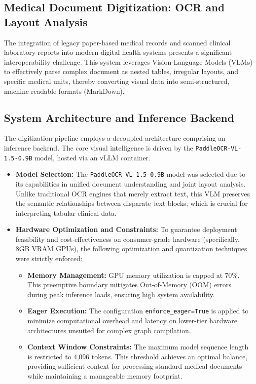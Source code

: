 \subsection{Medical Document Digitization: OCR and Layout Analysis}
\label{sec:ocr_pipeline}

The integration of legacy paper-based medical records and scanned clinical laboratory reports into modern digital health systems presents a significant interoperability challenge. This system leverages Vision-Language Models (VLMs) to effectively parse complex document as nested tables, irregular layouts, and specific medical units, thereby converting visual data into semi-structured, machine-readable formats (MarkDown).

\subsection{System Architecture and Inference Backend}
\label{subsec:ocr_backend}

The digitization pipeline employs a decoupled architecture comprising an inference backend. The core visual intelligence is driven by the \texttt{PaddleOCR-VL-1.5-0.9B} model, hosted via an vLLM container.

\begin{itemize}
    \item \textbf{Model Selection:} The \texttt{PaddleOCR-VL-1.5-0.9B} model was selected due to its capabilities in unified document understanding and joint layout analysis. Unlike traditional OCR engines that merely extract text, this VLM preserves the semantic relationships between disparate text blocks, which is crucial for interpreting tabular clinical data.
    \item \textbf{Hardware Optimization and Constraints:} To guarantee deployment feasibility and cost-effectiveness on consumer-grade hardware (specifically, 8GB VRAM GPUs), the following optimization and quantization techniques were strictly enforced:
    \begin{itemize}
        \item \textbf{Memory Management:} GPU memory utilization is capped at 70\%. This preemptive boundary mitigates Out-of-Memory (OOM) errors during peak inference loads, ensuring high system availability.
        \item \textbf{Eager Execution:} The configuration \texttt{enforce\_eager=True} is applied to minimize computational overhead and latency on lower-tier hardware architectures unsuited for complex graph compilation.
        \item \textbf{Context Window Constraints:} The maximum model sequence length is restricted to 4,096 tokens. This threshold achieves an optimal balance, providing sufficient context for processing standard medical documents while maintaining a manageable memory footprint.
    \end{itemize}
\end{itemize}

